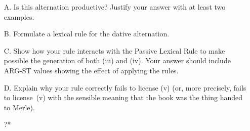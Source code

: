 \documentclass[a4paper,landscape,headrule,footrule,dvips]{foils}
\begin{document}
\begin{exe}
 
 
\end{exe}

\begin{itemize}
\item[A.] Is this alternation productive?  Justify your answer with at
  least two examples.
\item[B.] Formulate a  lexical rule for the dative
  alternation. 
\newpage
\item[C.] Show how your rule interacts with the Passive Lexical Rule
  to make possible the generation of both (iii) and (iv).  Your answer
  should include ARG-ST values showing the effect of applying the
  rules. 
\begin{exe}
 
  
\end{exe}
\item[D.] Explain why your rule correctly fails to license (v) (or,
more precisely, fails to license~(v) with the sensible meaning
that the book was the thing handed to Merle).
\begin{exe}
 ?*
\end{exe}
\end{itemize}
\end{document}
